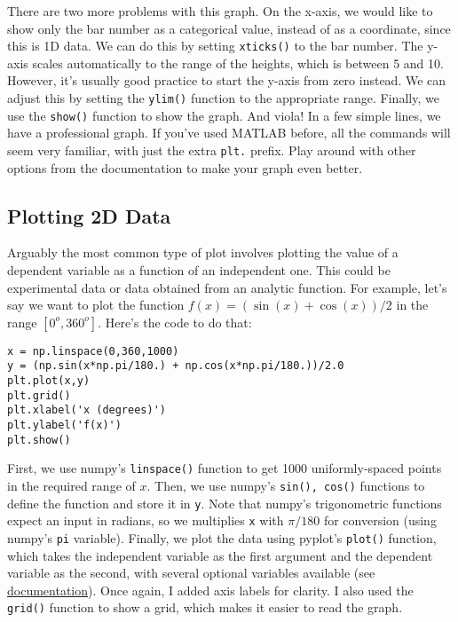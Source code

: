 \documentclass[12pt]{article}
\newcommand{\code}{\texttt}
\begin{document}
There are two more problems with this graph. On the x-axis, we would like to show only the bar number as a categorical value, instead of as a coordinate, since this is 1D data. We can do this by setting \code{xticks()} to the bar number. The y-axis scales automatically to the range of the heights, which is between 5 and 10. However, it's usually good practice to start the y-axis from zero instead. We can adjust this by setting the \code{ylim()} function to the appropriate range. Finally, we use the \code{show()} function to show the graph. And viola! In a few simple lines, we have a professional graph. If you've used MATLAB before, all the commands will seem very familiar, with just the extra \code{plt.} prefix. Play around with other options from the documentation to make your graph even better. 

\subsection{Plotting 2D Data}
Arguably the most common type of plot involves plotting the value of a dependent variable as a function of an independent one. This could be experimental data or data obtained from an analytic function. For example, let's say we want to plot the function $f(x) = (\sin(x)+\cos(x))/2$ in the range $[0^o,360^o]$. Here's the code to do that:

\begin{lstlisting}[frame=single] 
x = np.linspace(0,360,1000)
y = (np.sin(x*np.pi/180.) + np.cos(x*np.pi/180.))/2.0
plt.plot(x,y)
plt.grid()
plt.xlabel('x (degrees)')
plt.ylabel('f(x)')
plt.show()
\end{lstlisting}

First, we use numpy's \code{linspace()} function to get 1000 uniformly-spaced points in the required range of $x$. Then, we use numpy's \code{sin(), cos()} functions to define the function and store it in \code{y}. Note that numpy's trigonometric functions expect an input in radians, so we multiplies \code{x} with $\pi/180$ for conversion (using numpy's \code{pi} variable). Finally, we plot the data using pyplot's \code{plot()} function, which takes the independent variable as the first argument and the dependent variable as the second, with several optional variables available (see \href{https://matplotlib.org/api/_as_gen/matplotlib.pyplot.plot.html}{documentation}). Once again, I added axis labels for clarity. I also used the \code{grid()} function to show a grid, which makes it easier to read the graph. 
\end{document}
